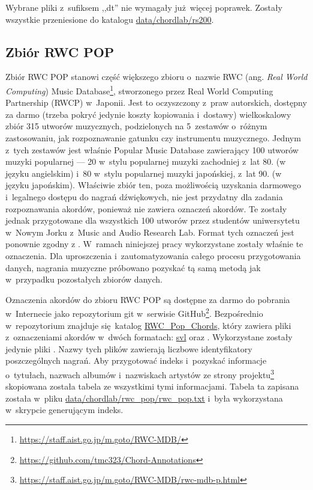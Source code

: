 Wybrane pliki z~sufiksem ,,dt'' nie wymagały już więcej poprawek. Zostały wszystkie przeniesione do katalogu \url{data/chordlab/rs200}.

\subsection{Zbiór RWC POP}

Zbiór RWC POP \cite{goto_rwc_nodate} stanowi część większego zbioru o~nazwie RWC (ang. \emph{Real World Computing}) Music Database\footnote{\url{https://staff.aist.go.jp/m.goto/RWC-MDB/}}, stworzonego przez Real World Computing Partnership (RWCP) w~Japonii. Jest to oczyszczony z~praw autorskich, dostępny za darmo (trzeba pokryć jedynie koszty kopiowania i~dostawy) wielkoskalowy zbiór 315 utworów muzycznych, podzielonych na 5~zestawów o~różnym zastosowaniu, jak rozpoznawanie gatunku czy instrumentu muzycznego. Jednym z~tych zestawów jest właśnie Popular Music Database zawierający 100 utworów muzyki popularnej --- 20 w~stylu popularnej muzyki zachodniej z~lat 80. (w języku angielskim) i~80 w~stylu popularnej muzyki japońskiej, z~lat 90. (w języku japońskim). Właściwie zbiór ten, poza możliwością uzyskania darmowego i~legalnego dostępu do nagrań dźwiękowych, nie jest przydatny dla zadania rozpoznawania akordów, ponieważ nie zawiera oznaczeń akordów. Te zostały jednak przygotowane dla wszystkich 100 utworów przez studentów uniwersytetu w~Nowym Jorku z~Music and Audio Research Lab. Format tych oznaczeń jest ponownie zgodny z \cite{harte_towards_nodate}. W~ramach niniejszej pracy wykorzystane zostały właśnie te oznaczenia.  Dla uproszczenia i~zautomatyzowania całego procesu przygotowania danych, nagrania muzyczne próbowano pozyskać tą samą metodą jak w~przypadku pozostałych zbiorów danych.

Oznaczenia akordów do zbioru RWC POP są dostępne za darmo do pobrania w~Internecie jako repozytorium git w~serwisie GitHub\footnote{\url{https://github.com/tmc323/Chord-Annotations}}. Bezpośrednio w~repozytorium znajduje się katalog \url{RWC_Pop_Chords}, który zawiera pliki z~oznaczeniami akordów w~dwóch formatach: \url{svl} oraz . Wykorzystane zostały jedynie pliki . Nazwy tych plików zawierają liczbowe identyfikatory poszczególnych nagrań. Aby przygotować indeks i~pozyskać informacje o~tytułach, nazwach albumów i~nazwiskach artystów ze strony projektu\footnote{\url{https://staff.aist.go.jp/m.goto/RWC-MDB/rwc-mdb-p.html}} skopiowana została tabela ze wszystkimi tymi informacjami. Tabela ta zapisana została w~pliku \url{data/chordlab/rwc_pop/rwc_pop.txt} i~była wykorzystana w~skrypcie generującym indeks.

